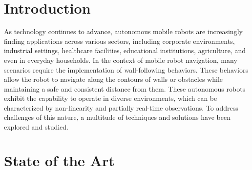 \documentclass[conference]{IEEEtran}
\begin{document}
\section{Introduction}
As technology continues to advance, autonomous mobile robots are increasingly finding applications across various sectors, including corporate environments, industrial settings, healthcare facilities, educational institutions, agriculture, and even in everyday households.
In the context of mobile robot navigation, many scenarios require the implementation of wall-following behaviors. These behaviors allow the robot to navigate along the contours of walls or obstacles while maintaining a safe and consistent distance from them. These autonomous robots exhibit the capability to operate in diverse environments, which can be characterized by non-linearity and partially real-time observations. To address challenges of this nature, a multitude of techniques and solutions have been explored and studied.



\section{State of the Art}
\end{document}
